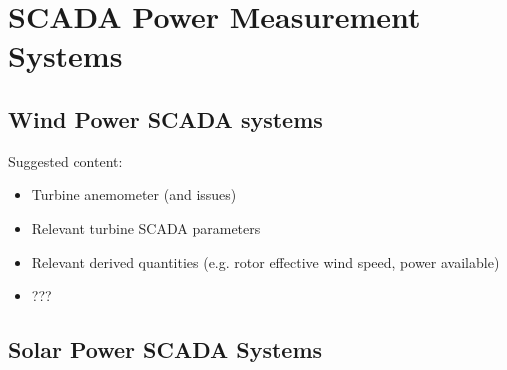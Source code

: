 \section{SCADA Power Measurement Systems {\color{magenta}{Contributing author: JB}}}\label{sec:scadasystems}

\subsection{Wind Power SCADA systems }\label{subsec:scadasolar}

Suggested content:
\begin{itemize}
    \item Turbine anemometer (and issues)
    \item Relevant turbine SCADA parameters
    \item Relevant derived quantities (e.g. rotor effective wind speed, power available)
    \item ???
\end{itemize}

\subsection{Solar Power SCADA Systems }\label{subsec:scadawind}




